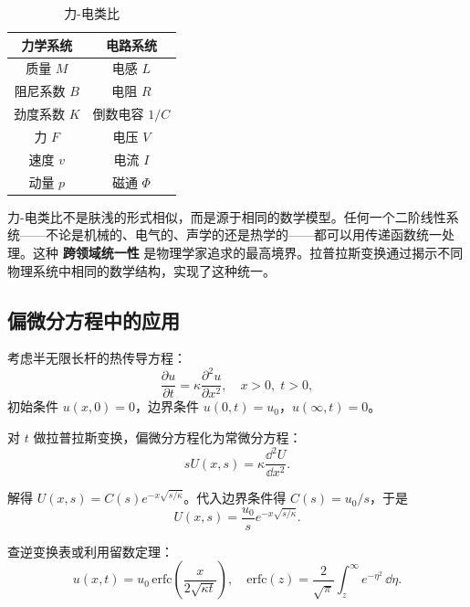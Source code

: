 \begin{table}[h]
\centering
\caption{力-电类比}
\label{tab:mech_elect_analogy}
\begin{tabular}{c|c}
\toprule
力学系统 & 电路系统 \\
\midrule
质量 $M$ & 电感 $L$ \\
阻尼系数 $B$ & 电阻 $R$ \\
劲度系数 $K$ & 倒数电容 $1/C$ \\
力 $F$ & 电压 $V$ \\
速度 $v$ & 电流 $I$ \\
动量 $p$ & 磁通 $\Phi$ \\
\bottomrule
\end{tabular}
\end{table}

\begin{insight}
力-电类比不是肤浅的形式相似，而是源于相同的数学模型。任何一个二阶线性系统——不论是机械的、电气的、声学的还是热学的——都可以用传递函数统一处理。这种 \textbf{跨领域统一性} 是物理学家追求的最高境界。拉普拉斯变换通过揭示不同物理系统中相同的数学结构，实现了这种统一。
\end{insight}

\subsection{偏微分方程中的应用}

考虑半无限长杆的热传导方程：
\begin{equation}
\frac{\partial u}{\partial t} = \kappa \frac{\partial^2 u}{\partial x^2},\quad
x>0,\; t>0,
\end{equation}
初始条件 $u(x,0)=0$，边界条件 $u(0,t)=u_0$，$u(\infty,t)=0$。

对 $t$ 做拉普拉斯变换，偏微分方程化为常微分方程：
\begin{equation}
sU(x,s) = \kappa \frac{\dd^2 U}{\dd x^2}.
\end{equation}

解得 $U(x,s) = C(s)e^{-x\sqrt{s/\kappa}}$。代入边界条件得 $C(s) = u_0/s$，于是
\begin{equation}
U(x,s) = \frac{u_0}{s}e^{-x\sqrt{s/\kappa}}.
\end{equation}

查逆变换表或利用留数定理：
\begin{equation}
u(x,t) = u_0\,\mathrm{erfc}\!\left(\frac{x}{2\sqrt{\kappa t}}\right),
\quad \mathrm{erfc}(z) = \frac{2}{\sqrt{\pi}}\int_z^{\infty} e^{-\eta^2}\,\dd\eta.
\label{eq:heat_laplace_sol}
\end{equation}

